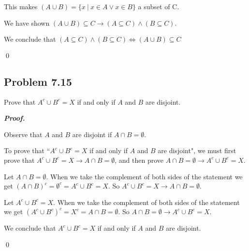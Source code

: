 \documentclass{article}
\begin{document}
This makes $(A \cup B)=\{x\ |\ x \in A \lor x \in B \}$ a subset of C.

We have shown $(A \cup B) \subseteq C \rightarrow (A \subseteq C) \land (B \subseteq C)$.

We conclude that $(A \subseteq C) \land (B \subseteq C) \iff (A \cup B) \subseteq C$

\qed


\pagebreak
\subsection{Problem 7.15}
Prove that $A^c \cup B^c = X$ if and only if $A$ and $B$ are disjoint.

\textbf{\textit{Proof.}}

Observe that $A$ and $B$ are disjoint if $A \cap B = \emptyset$.

To prove that  ``$A^c \cup B^c = X$ if and only if $A$ and $B$ are disjoint", we must first prove that $A^c \cup B^c = X \rightarrow A \cap B = \emptyset$, and then prove $A \cap B = \emptyset \rightarrow A^c \cup B^c = X$.

Let $A \cap B = \emptyset$. When we take the complement of both sides of the statement we get
$(A \cap B)^c = \emptyset^c = A^c \cup B^c = X$. So $A^c \cup B^c = X \rightarrow A \cap B = \emptyset$.

Let $A^c \cup B^c = X$. When we take the complement of both sides of the statement we get
$(A^c \cup B^c)^c = X^c = A \cap B = \emptyset$. So $A \cap B = \emptyset \rightarrow A^c \cup B^c = X$.

We conclude that $A^c \cup B^c = X$ if and only if $A$ and $B$ are disjoint.


\qed
\end{document}
